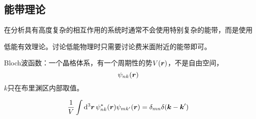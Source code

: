 \documentclass[hyperref, UTF8, a4paper]{ctexart}
\begin{document}
\subsection{能带理论}

在分析具有高度复杂的相互作用的系统时通常不会使用特别复杂的能带，而是使用

低能有效理论。讨论低能物理时只需要讨论费米面附近的能带即可。

Bloch波函数：一个晶格体系，有一个周期性的势$V(\vb*{r})$，不是自由空间，
\[
    \psi_{nk}(\vb*{r})
\]
$k$只在布里渊区内部取值。

\[
    \frac{1}{V} \int \dd[3]{\vb*{r}} \psi_{nk}^*(\vb*{r}) \psi_{mk'}(\vb*{r}) = \delta_{mn} \delta(\vb*{k}-\vb*{k}')
\]
\end{document}
